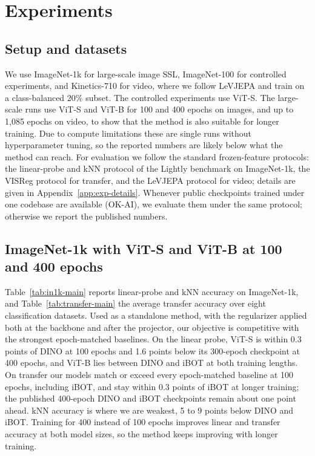 \section{Experiments}
\label{sec:experiments}

\subsection{Setup and datasets}
\label{sec:exp-setup}
We use ImageNet-1k for large-scale image SSL, ImageNet-100 for controlled experiments, and Kinetics-710 for video, where we follow LeVJEPA and train on a class-balanced 20\% subset. The controlled experiments use ViT-S. The large-scale runs use ViT-S and ViT-B for 100 and 400 epochs on images, and up to 1{,}085 epochs on video, to show that the method is also suitable for longer training. Due to compute limitations these are single runs without hyperparameter tuning, so the reported numbers are likely below what the method can reach. For evaluation we follow the standard frozen-feature protocols: the linear-probe and kNN protocol of the Lightly benchmark on ImageNet-1k, the VISReg protocol for transfer, and the LeVJEPA protocol for video; details are given in Appendix~\ref{app:exp-details}. Whenever public checkpoints trained under one codebase are available (OK-AI), we evaluate them under the same protocol; otherwise we report the published numbers.

\subsection{ImageNet-1k with ViT-S and ViT-B at 100 and 400 epochs}
\label{sec:exp-in1k}
Table~\ref{tab:in1k-main} reports linear-probe and kNN accuracy on ImageNet-1k, and Table~\ref{tab:transfer-main} the average transfer accuracy over eight classification datasets. Used as a standalone method, with the regularizer applied both at the backbone and after the projector, our objective is competitive with the strongest epoch-matched baselines. On the linear probe, ViT-S is within 0.3 points of DINO at 100 epochs and 1.6 points below its 300-epoch checkpoint at 400 epochs, and ViT-B lies between DINO and iBOT at both training lengths. On transfer our models match or exceed every epoch-matched baseline at 100 epochs, including iBOT, and stay within 0.3 points of iBOT at longer training; the published 400-epoch DINO and iBOT checkpoints remain about one point ahead. kNN accuracy is where we are weakest, 5 to 9 points below DINO and iBOT. Training for 400 instead of 100 epochs improves linear and transfer accuracy at both model sizes, so the method keeps improving with longer training.

